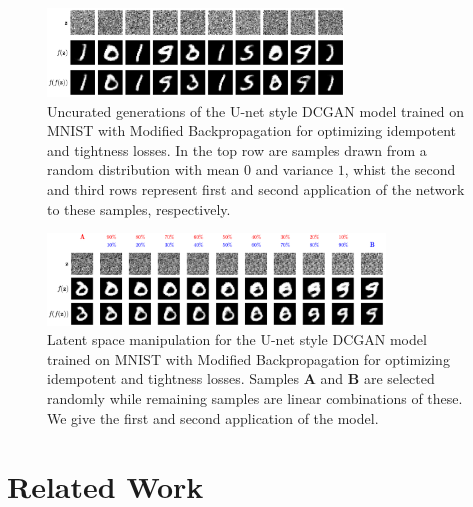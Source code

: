 \documentclass{article}
\theoremstyle{plain}
\theoremstyle{definition}
\theoremstyle{remark}
\begin{document}
\begin{figure}[htbp]
    \centering
    \includegraphics[width=0.7\textwidth]{./resources/modified_0-1_0-1_rand_noise_mapping.png}
    \caption{Uncurated generations of the U-net style DCGAN model trained on MNIST with Modified Backpropagation for optimizing idempotent and tightness losses. In the top row are samples drawn from a random distribution with mean $0$ and variance $1$, whist the second and third rows represent first and second application of the network to these samples, respectively.}
    \label{fig:gen-mnist}
\end{figure}


\begin{figure}[htbp]
    \centering
    \includegraphics[width=0.8\textwidth]{./resources/modified_0-1_0-1_rand_latent_space.png}
    \caption{Latent space manipulation for the U-net style DCGAN model trained on MNIST with Modified Backpropagation for optimizing idempotent and tightness losses. Samples $\mathbf{A}$ and $\mathbf{B}$ are selected randomly while remaining samples are linear combinations of these. We give the first and second application of the model.}
    \label{fig:latent-mnist}
\end{figure}



\section{Related Work}
\label{sec:related}
\end{document}
